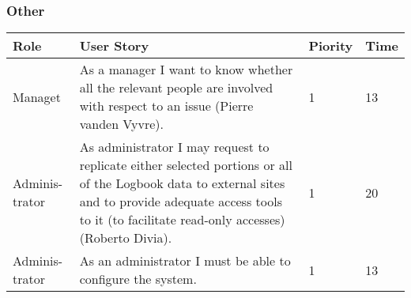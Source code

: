 \subsubsection{Other}
\begin{longtable}{ | p{2cm} | p{8cm} | p{1.5cm} | l |}
\hline
Role & User Story & Piority & Time \\ \hline
Managet & As a manager I want to know whether all the relevant people are
involved with respect to an issue (Pierre vanden Vyvre). & 1 & 13 \\ \hline
Adminis-trator & As administrator I may request to replicate either selected portions
or all of the Logbook data to external sites and to provide adequate access tools to it (to facilitate read-only accesses) (Roberto Divia). & 1 & 20 \\ \hline
Adminis-trator & As an administrator I must be able to configure the system. & 1 & 13 \\ \hline


\end{longtable}

